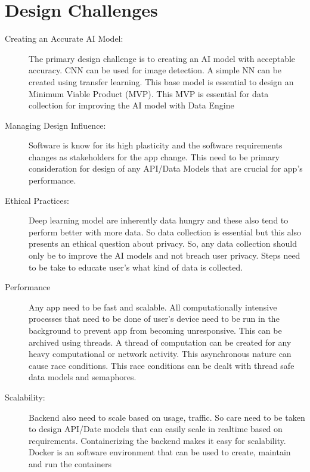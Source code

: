 \documentclass[../Report.tex]{subfiles}
\begin{document}
\section{Design Challenges}
\begin{description}
    \item[Creating an Accurate AI Model: ] The primary design challenge is to creating an AI model with acceptable accuracy. CNN
    can be used for image detection. A simple NN can be created using transfer learning. This base model is 
    essential to design an Minimum Viable Product (MVP). This MVP is essential for data collection for improving the AI model with Data 
    Engine
    
    \item[Managing Design Influence: ] Software is know for its high plasticity and the software requirements changes as stakeholders for
    the app change. This need to be primary consideration for design of any API/Data Models that are crucial for app's performance.

    \item[Ethical Practices: ] Deep learning model are inherently data hungry and these also tend to perform better with more data. So
    data collection is essential but this also presents an ethical question about privacy. So, any data collection should only be to 
    improve the AI models and not breach user privacy. Steps need to be take to educate user's what kind of data is collected.

    \item[Performance] Any app need to be fast and scalable. All computationally intensive processes that need to be 
    done of user's device need to be run in the background to prevent app from becoming unresponsive. This can be archived using 
    threads. A thread of computation can be created for any heavy computational or network activity. This asynchronous nature can 
    cause race conditions. This race conditions can be dealt with thread safe data models and semaphores.
    
    \item[Scalability: ]
    Backend also need to scale based on usage, traffic. So care need to be taken to design API/Date models that can easily scale in 
    realtime based on requirements. Containerizing the backend makes it easy for scalability. Docker is an software environment that
    can be used to create, maintain and run the containers
\end{description}
\end{document}
